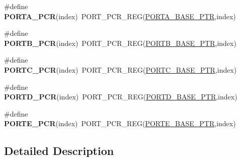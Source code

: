 \begin{DoxyCompactItemize}
\#define {\bfseries P\+O\+R\+T\+A\+\_\+\+P\+CR}(index)~P\+O\+R\+T\+\_\+\+P\+C\+R\+\_\+\+R\+EG(\hyperlink{group___p_o_r_t___peripheral_gaa18ec7594fe603225220ec6eda4a19ce}{P\+O\+R\+T\+A\+\_\+\+B\+A\+S\+E\+\_\+\+P\+TR},index)
\item 
\mbox{\label{group___p_o_r_t___register___accessor___macros_ga4b01c5065231a73f13aab0bc2a0de4b3}} 
\#define {\bfseries P\+O\+R\+T\+B\+\_\+\+P\+CR}(index)~P\+O\+R\+T\+\_\+\+P\+C\+R\+\_\+\+R\+EG(\hyperlink{group___p_o_r_t___peripheral_ga585b4782d1ceb44492289af0019480f9}{P\+O\+R\+T\+B\+\_\+\+B\+A\+S\+E\+\_\+\+P\+TR},index)
\item 
\mbox{\label{group___p_o_r_t___register___accessor___macros_ga75241e82a338f32753a385c88421a30e}} 
\#define {\bfseries P\+O\+R\+T\+C\+\_\+\+P\+CR}(index)~P\+O\+R\+T\+\_\+\+P\+C\+R\+\_\+\+R\+EG(\hyperlink{group___p_o_r_t___peripheral_ga03c740cdda17711afafc932723871474}{P\+O\+R\+T\+C\+\_\+\+B\+A\+S\+E\+\_\+\+P\+TR},index)
\item 
\mbox{\label{group___p_o_r_t___register___accessor___macros_gaf8baf1fbb9a157629a0482476cd07a68}} 
\#define {\bfseries P\+O\+R\+T\+D\+\_\+\+P\+CR}(index)~P\+O\+R\+T\+\_\+\+P\+C\+R\+\_\+\+R\+EG(\hyperlink{group___p_o_r_t___peripheral_ga7f5a263751543810ebfdbde278383276}{P\+O\+R\+T\+D\+\_\+\+B\+A\+S\+E\+\_\+\+P\+TR},index)
\item 
\mbox{\label{group___p_o_r_t___register___accessor___macros_gaf631c8cdff059152b15250d1fe08862c}} 
\#define {\bfseries P\+O\+R\+T\+E\+\_\+\+P\+CR}(index)~P\+O\+R\+T\+\_\+\+P\+C\+R\+\_\+\+R\+EG(\hyperlink{group___p_o_r_t___peripheral_gab166fe285bbb15b52de610f408fe25d3}{P\+O\+R\+T\+E\+\_\+\+B\+A\+S\+E\+\_\+\+P\+TR},index)
\end{DoxyCompactItemize}


\subsection{Detailed Description}
